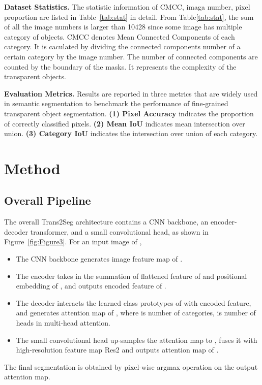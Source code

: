 \documentclass{article}
\begin{document}
\textbf{Dataset Statistics.}
The statistic information of 
CMCC, imaga number, pixel proportion are listed in Table~\ref{tab:stat} in detail. From Table\ref{tab:stat}, the sum of all the image numbers is larger than 10428 since some image has multiple category of objects. CMCC denotes Mean Connected Components of each category. It is caculated by dividing the connected components number of a certain category by the image number. The number of connected components are counted by the boundary of the masks. It represents the complexity of the transparent objects.


\textbf{Evaluation Metrics.}
Results are reported in three metrics that are widely used in semantic segmentation to benchmark the performance of fine-grained transparent object segmentation. 
\textbf{(1) Pixel Accuracy} indicates the proportion of correctly classified pixels.
\textbf{(2) Mean IoU} indicates mean intersection over union.
\textbf{(3) Category IoU} indicates the intersection over union of each category.


\section{Method}

\subsection{Overall Pipeline}
The overall Trans2Seg architecture contains a CNN backbone, an encoder-decoder transformer, and a small convolutional head, as shown in Figure~\ref{fig:Figure3}. For an input image of , 
\begin{itemize}
    \item The CNN backbone generates image feature map of .
    \item The encoder takes in the summation of flattened feature of  and positional embedding of , and outputs encoded feature of .
    \item The decoder interacts the learned class prototypes of  with encoded feature, and generates attention map of , where  is number of categories,  is number of heads in multi-head attention.
    \item The small convolutional head up-samples the attention map to ,  fuses it with high-resolution feature map Res2 and outputs attention map of . 
\end{itemize}
The final segmentation is obtained by pixel-wise argmax operation on the output attention map.
\end{document}
